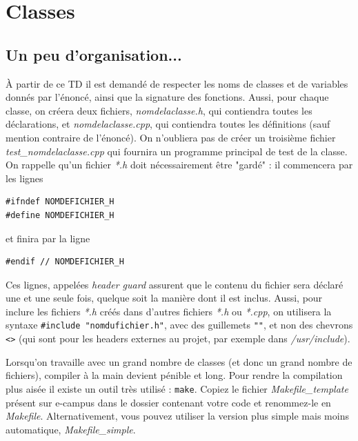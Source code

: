 \documentclass{book}
\newcommand{\inline}[1]{\texttt{#1}}
\def\filename{\emph}
\begin{document}
\setcounter{chapter}{1}
\chapter{Classes}

\section{Un peu d'organisation...}

\begin{warning}
À partir de ce TD il est demandé de respecter les noms de classes et de variables donnés par l'énoncé, ainsi que la signature des fonctions. Aussi, pour chaque classe, on créera deux fichiers, \filename{nomdelaclasse.h}, qui contiendra toutes les déclarations, et \filename{nomdelaclasse.cpp}, qui contiendra toutes les définitions (sauf mention contraire de l'énoncé). On n'oubliera pas de créer un troisième fichier \filename{test\_nomdelaclasse.cpp} qui fournira un programme principal de test de la classe. On rappelle qu'un fichier \filename{*.h} doit nécessairement être "gardé" : il commencera par les lignes
\begin{verbatim}
#ifndef NOMDEFICHIER_H
#define NOMDEFICHIER_H
\end{verbatim}
et finira par la ligne
\begin{verbatim}
#endif // NOMDEFICHIER_H
\end{verbatim}
Ces lignes, appelées \emph{header guard} assurent que le contenu du fichier sera déclaré une et une seule fois, quelque soit la manière dont il est inclus. Aussi, pour inclure les fichiers \filename{*.h} créés dans d'autres fichiers \filename{*.h} ou \filename{*.cpp}, on utilisera la syntaxe \texttt{#include "nomdufichier.h"}, avec des guillemets \inline{""}, et non des chevrons \inline{<>} (qui sont pour les headers externes au projet, par exemple dans \filename{/usr/include}).
\end{warning}

Lorsqu'on travaille avec un grand nombre de classes (et donc un grand nombre de fichiers), compiler à la main devient pénible et long. Pour rendre la compilation plus aisée il existe un outil très utilisé : \texttt{make}. Copiez le fichier \filename{Makefile\_template} présent sur e-campus dans le dossier contenant votre code et renommez-le en \filename{Makefile}. Alternativement, vous pouvez utiliser la version plus simple mais moins automatique, \filename{Makefile\_simple}.\\
\end{document}
